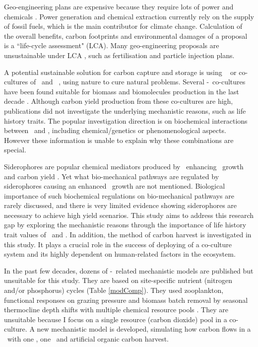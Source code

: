 \documentclass[../thesis.tex]{subfiles} %
\begin{document}
Geo-engineering plans are expensive because they require lots of power and chemicals \autocite{boyd2008ranking,boyd2008implications,mcclellan2012cost}.  Power generation and chemical extraction currently rely on the supply of fossil fuels, which is the main contributor for climate change.  Calculation of the overall benefits, carbon footprints and environmental damages of a proposal is a ``life-cycle assessment" (LCA).  Many geo-engineering proposals are unsustainable under LCA \autocite{abdussalam2020green}, such as fertilisation and particle injection plans.

A potential sustainable solution for carbon capture and storage is using \phy\ \autocite{farrelly2013carbon} or co-cultures of \phy\ and \bac\ \autocite{fuentes2016impact}, using nature to cure natural problems.  Several \phy-\bac\ co-cultures have been found suitable for biomass and biomolecules production in the last decade \autocite{fuentes2016impact,santos2014microalgal}.  Although carbon yield production from these co-cultures are high, publications did not investigate the underlying mechanistic reasons, such as life history traits.  The popular investigation direction is on biochemical interactions between \phy\ and \bac, including chemical/genetics \autocite{amin2009photolysis,durham2015cryptic,leyva2014accumulation,rivas2010interactions,seyedsayamdost2011roseobacticides} or phenomenological \autocite{choix2012enhanced1,choix2012enhanced2,kazamia2012mutualistic,santos2014microalgal} aspects.  However these information is unable to explain why these combinations are special.

Siderophores are popular chemical mediators produced by \bac\ enhancing \phy\ growth and carbon yield \autocite{fuentes2016impact}.  Yet what bio-mechanical pathways are regulated by siderophores causing an enhanced \phy\ growth are not mentioned.  Biological importance of such biochemical regulations on bio-mechanical pathways are rarely discussed, and there is very limited evidence showing siderophores are necessary to achieve high yield scenarios.  This study aims to address this research gap by exploring the mechanistic reasons through the importance of life history trait values of \phy\ and \bac.  In addition, the method of carbon harvest is investigated in this study.  It plays a crucial role in the success of deploying of a co-culture system and its highly dependent on human-related factors in the ecosystem.

In the past few decades, dozens of \phy-\bac\ related mechanistic models are published but unsuitable for this study.  They are based on site-specific nutrient (nitrogen and/or phosphorus) cycles (Table \ref{modComp}).  They used zooplankton, functional responses on grazing pressure and biomass batch removal by seasonal thermocline depth shifts \autocite{anderson2015empower,kidston2013phytoplankton,llebot2010role}
with multiple chemical resource pools \autocite{llebot2010role,mitra2009closure,findlay2006modelling}.  They are unsuitable because I focus on a single resource (carbon dioxide) pool in a co-culture.  A new mechanistic model is developed, simulating how carbon flows in a \pbs\ with one \phy, one \bacm\ and artificial organic carbon harvest.
\end{document}
